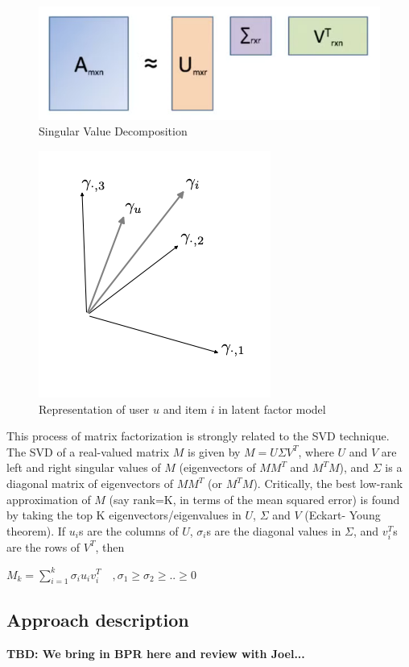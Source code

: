 \documentclass{article}
\begin{document}
\begin{figure}[h]
    \centering
    \includegraphics[width=0.75\linewidth]{images/image2.png}
    \caption{Singular Value Decomposition}
    \label{fig:svd}
\end{figure}

\begin{figure}[h]
    \includegraphics[width=0.4\linewidth]{images/ui_vectors.png}
    \caption{Representation of user $u$ and item $i$ in latent factor model}
    \label{fig:ui_vectors}
\end{figure}

This process of matrix factorization is strongly related to the SVD technique. The SVD of a real-valued matrix $M$ is given by $M=U \Sigma V^T$, where $U$ and $V$ are left and right singular values of $M$ (eigenvectors of $MM^T$ and $M^T M$), and $\Sigma$ is a diagonal matrix of eigenvectors of $MM^T$ (or $M^T M$). Critically, the best low-rank approximation of $M$ (say rank=K, in terms of the mean squared error) is found by taking the top K eigenvectors/eigenvalues in $U$, $\Sigma$ and $V$ (Eckart- Young theorem). If $u_i$s are the columns of $U$, $\sigma_i$s are the diagonal values in $\Sigma$, and $v_i^T$s are the rows of $V^T$, then

$M_k = \sum_{i=1}^{k} \sigma_i u_i v_i^T \quad , \sigma_1 \ge \sigma_2 \ge .. \ge 0$

\subsection{Approach description}
\textbf{TBD: We bring in BPR here and review with Joel...}
\end{document}
